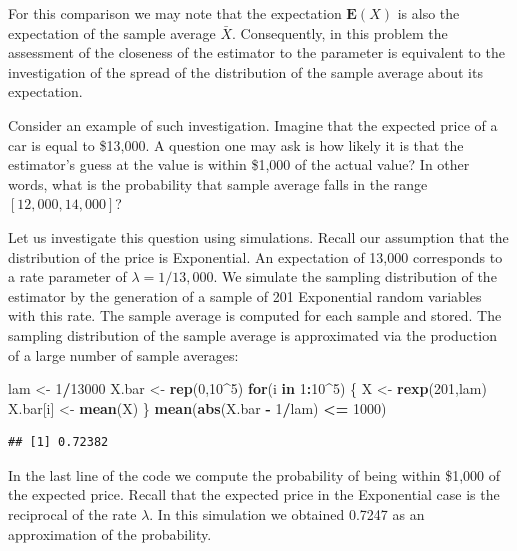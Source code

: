 \documentclass[]{krantz}
\makeatletter
\newenvironment{Shaded}{\begin{snugshade}}{\end{snugshade}}
\newcommand{\ControlFlowTok}[1]{\textcolor[rgb]{0.13,0.29,0.53}{\textbf{#1}}}
\newcommand{\DecValTok}[1]{\textcolor[rgb]{0.00,0.00,0.81}{#1}}
\newcommand{\KeywordTok}[1]{\textcolor[rgb]{0.13,0.29,0.53}{\textbf{#1}}}
\newcommand{\NormalTok}[1]{#1}
\newcommand{\OperatorTok}[1]{\textcolor[rgb]{0.81,0.36,0.00}{\textbf{#1}}}
\newcommand{\StringTok}[1]{\textcolor[rgb]{0.31,0.60,0.02}{#1}}
\newcommand{\Expec}{\mathbf{E}}
\newenvironment{kframe}{%
\medskip{}
\setlength{\fboxsep}{.8em}
 \def\at@end@of@kframe{}%
 \ifinner\ifhmode%
  \def\at@end@of@kframe{\end{minipage}}%
  \begin{minipage}{\columnwidth}%
 \fi\fi%
 \def\FrameCommand##1{\hskip\@totalleftmargin \hskip-\fboxsep
 \colorbox{shadecolor}{##1}\hskip-\fboxsep
     \hskip-\linewidth \hskip-\@totalleftmargin \hskip\columnwidth}%
 \MakeFramed {\advance\hsize-\width
   \@totalleftmargin\z@ \linewidth\hsize
   \@setminipage}}%
 {\par\unskip\endMakeFramed%
 \at@end@of@kframe}
\renewenvironment{Shaded}{\begin{kframe}}{\end{kframe}}
\theoremstyle{definition}
\theoremstyle{definition}
\theoremstyle{definition}
\theoremstyle{remark}
\makeatother
\begin{document}
For this comparison we may note that the expectation \(\Expec(X)\) is also
the expectation of the sample average \(\bar X\). Consequently, in this
problem the assessment of the closeness of the estimator to the
parameter is equivalent to the investigation of the spread of the
distribution of the sample average about its expectation.

Consider an example of such investigation. Imagine that the expected
price of a car is equal to \$13,000. A question one may ask is how
likely it is that the estimator's guess at the value is within \$1,000
of the actual value? In other words, what is the probability that sample
average falls in the range \([12,000, 14,000]\)?

Let us investigate this question using simulations. Recall our
assumption that the distribution of the price is Exponential. An
expectation of 13,000 corresponds to a rate parameter of
\(\lambda = 1/13,000\). We simulate the sampling distribution of the
estimator by the generation of a sample of 201 Exponential random
variables with this rate. The sample average is computed for each sample
and stored. The sampling distribution of the sample average is
approximated via the production of a large number of sample averages:

\begin{Shaded}
\begin{Highlighting}[]
\NormalTok{lam <-}\StringTok{ }\DecValTok{1}\OperatorTok{/}\DecValTok{13000}
\NormalTok{X.bar <-}\StringTok{ }\KeywordTok{rep}\NormalTok{(}\DecValTok{0}\NormalTok{,}\DecValTok{10}\OperatorTok{^}\DecValTok{5}\NormalTok{)}
\ControlFlowTok{for}\NormalTok{(i }\ControlFlowTok{in} \DecValTok{1}\OperatorTok{:}\DecValTok{10}\OperatorTok{^}\DecValTok{5}\NormalTok{) \{}
\NormalTok{  X <-}\StringTok{ }\KeywordTok{rexp}\NormalTok{(}\DecValTok{201}\NormalTok{,lam)}
\NormalTok{  X.bar[i] <-}\StringTok{ }\KeywordTok{mean}\NormalTok{(X)}
\NormalTok{\}}
\KeywordTok{mean}\NormalTok{(}\KeywordTok{abs}\NormalTok{(X.bar }\OperatorTok{-}\StringTok{ }\DecValTok{1}\OperatorTok{/}\NormalTok{lam) }\OperatorTok{<=}\StringTok{ }\DecValTok{1000}\NormalTok{)}
\end{Highlighting}
\end{Shaded}

\begin{verbatim}
## [1] 0.72382
\end{verbatim}

In the last line of the code we compute the probability of being within
\$1,000 of the expected price. Recall that the expected price in the
Exponential case is the reciprocal of the rate \(\lambda\). In this
simulation we obtained 0.7247 as an approximation of the probability.
\end{document}
